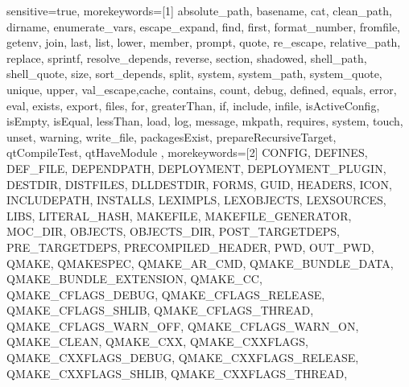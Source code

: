 {
    sensitive=true,
    morekeywords=[1]{
        absolute_path,
        basename,
        cat,
        clean_path,
        dirname,
        enumerate_vars,
        escape_expand,
        find,
        first,
        format_number,
        fromfile,
        getenv,
        join,
        last,
        list,
        lower,
        member,
        prompt,
        quote,
        re_escape,
        relative_path,
        replace,
        sprintf,
        resolve_depends,
        reverse,
        section,
        shadowed,
        shell_path,
        shell_quote,
        size,
        sort_depends,
        split,
        system,
        system_path,
        system_quote,
        unique,
        upper,
        val_escape,cache,
        contains,
        count,
        debug,
        defined,
        equals,
        error,
        eval,
        exists,
        export,
        files,
        for,
        greaterThan,
        if,
        include,
        infile,
        isActiveConfig,
        isEmpty,
        isEqual,
        lessThan,
        load,
        log,
        message,
        mkpath,
        requires,
        system,
        touch,
        unset,
        warning,
        write_file,
        packagesExist,
        prepareRecursiveTarget,
        qtCompileTest,
        qtHaveModule
    },
    morekeywords=[2]{
            CONFIG,
            DEFINES,
            DEF_FILE,
            DEPENDPATH,
            DEPLOYMENT,
            DEPLOYMENT_PLUGIN,
            DESTDIR,
            DISTFILES,
            DLLDESTDIR,
            FORMS,
            GUID,
            HEADERS,
            ICON,
            INCLUDEPATH,
            INSTALLS,
            LEXIMPLS,
            LEXOBJECTS,
            LEXSOURCES,
            LIBS,
            LITERAL_HASH,
            MAKEFILE,
            MAKEFILE_GENERATOR,
            MOC_DIR,
            OBJECTS,
            OBJECTS_DIR,
            POST_TARGETDEPS,
            PRE_TARGETDEPS,
            PRECOMPILED_HEADER,
            PWD,
            OUT_PWD,
            QMAKE,
            QMAKESPEC,
            QMAKE_AR_CMD,
            QMAKE_BUNDLE_DATA,
            QMAKE_BUNDLE_EXTENSION,
            QMAKE_CC,
            QMAKE_CFLAGS_DEBUG,
            QMAKE_CFLAGS_RELEASE,
            QMAKE_CFLAGS_SHLIB,
            QMAKE_CFLAGS_THREAD,
            QMAKE_CFLAGS_WARN_OFF,
            QMAKE_CFLAGS_WARN_ON,
            QMAKE_CLEAN,
            QMAKE_CXX,
            QMAKE_CXXFLAGS,
            QMAKE_CXXFLAGS_DEBUG,
            QMAKE_CXXFLAGS_RELEASE,
            QMAKE_CXXFLAGS_SHLIB,
            QMAKE_CXXFLAGS_THREAD,
}}
